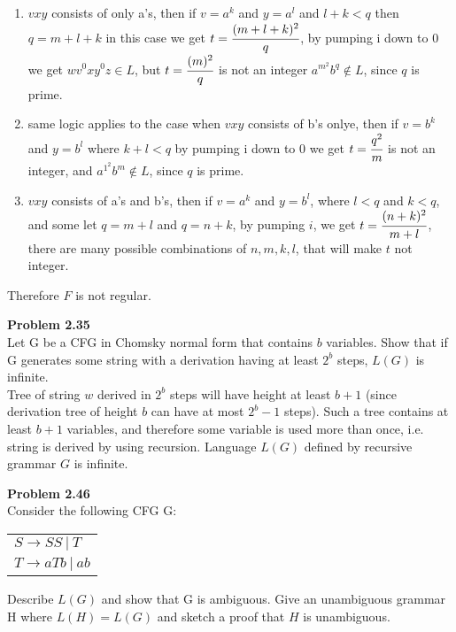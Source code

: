 \documentclass{article}
\newcommand{\problem}[1]{\large{\textbf{Problem #1} \\}}
\begin{document}
\begin{enumerate}[\underline{Case} 1., leftmargin = 1.5cm]
\itemsep0em
\item $vxy$ consists of only a's, then if $v = a^k$ and $y = a^l$ and $l + k < q$ then $q = m + l + k$ in this case we get 
    $t = \cfrac{(m+l+k)^2 }{q}$, by pumping i down to 0 we get $wv^0xy^0z \in L$, but $t = \cfrac{(m)^2 }{q}$ is not an integer
     $a^{m^2}b^q \notin L$, since $q$ is prime.
\item same logic applies to the case when $vxy$ consists of b's onlye, then if $v = b^k$ and $y =b^l$ where $k+l < q$
    by pumping i down to 0 we get $t = \cfrac{q^2}{m}$ is not an integer, and 
     $a^{1^2}b^m \notin L$, since $q$ is prime.
\item $vxy$ consists of a's and b's, then if $v = a^k$ and $y =b^l$, where $l < q$ and $k < q$, and some let $q = m +l$ 
    and $q = n + k$, by pumping $i$, we get
    $t = \cfrac{(n+k)^2 }{m+l}$,
    there are many possible combinations of $n,m,k,l$, that will make $t$ not integer.
\end{enumerate}

Therefore $F$ is not regular.

\vspace{0.4cm}
\problem{2.35}
Let G be a CFG in Chomsky normal form that contains $b$ variables. Show that if G generates some string with a derivation having 
at least $2^b$ steps, $L(G)$ is infinite. \\

Tree of string $w$ derived in $2^b$ steps will have height at least $b+1$ (since derivation tree of height $b$ 
can have at most $2^b - 1$ steps). Such a tree contains at least $b+1$ variables, and therefore some variable is used 
more than once, i.e. string is derived by using recursion. Language $L(G)$ defined by recursive grammar $G$ is infinite.

\vspace{0.4cm}
\problem{2.46}
Consider the following CFG G:
\begin{table}[h!]
\centering
\begin{tabular}{l}
$S \rightarrow SS \:| \:T$ \\
$T \rightarrow aTb \:| \:ab$
\end{tabular}
\end{table}
Describe $L(G)$ and show that G is ambiguous. Give an unambiguous grammar H where $L(H) = L(G)$ and
sketch a proof that $H$ is unambiguous. \\
\end{document}
